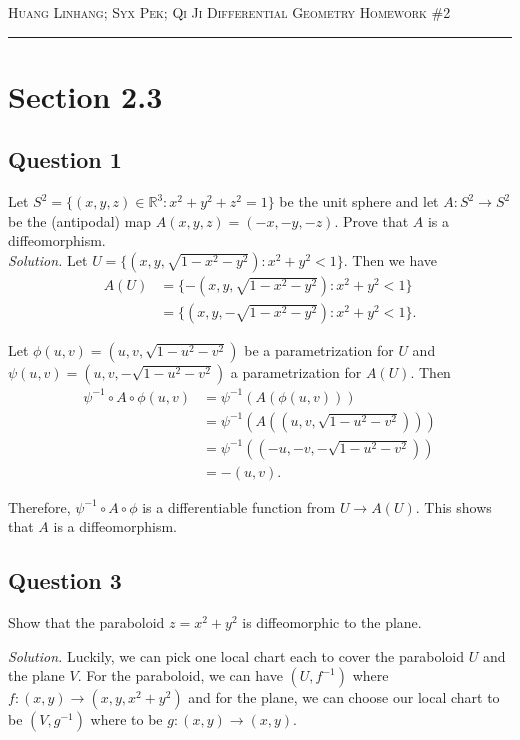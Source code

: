 \documentclass[12pt]{article}
\begin{document}
\thispagestyle{empty}

{\scshape Huang Linhang; Syx Pek; Qi Ji} \hfill {\scshape \large Differential Geometry} \hfill {\scshape Homework \#2}

\smallskip
\hrule
\bigskip

\section{Section 2.3}

\subsection*{Question 1}
Let $S^2 = \{(x,y,z) \in \mathbb{R}^3:x^2+y^2+z^2= 1\}$ be the unit sphere and let $A:S^2 \to S^2$ be the (antipodal) map $A(x,y, z) = (-x, -y, -z)$. Prove that $A$ is a diffeomorphism.\\

\textit{Solution.}
Let $U = \{(x,y,\sqrt{1-x^2-y^2}):x^2+y^2<1\}$. Then we have \begin{align*}
    A(U) &=\{-(x,y,\sqrt{1-x^2-y^2}):x^2+y^2<1\}\\
    &=\{(x,y,-\sqrt{1-x^2-y^2}):x^2+y^2<1\}.
\end{align*}

Let $\phi(u,v) = (u,v,\sqrt{1-u^2-v^2})$ be a parametrization for $U$ and $\psi(u,v) = (u,v,-\sqrt{1-u^2-v^2})$ a parametrization for $A(U)$. Then \begin{align*}
    \psi^{-1}\circ A\circ\phi(u,v) &= \psi^{-1}(A(\phi(u,v)))\\
    &= \psi^{-1}(A((u,v,\sqrt{1-u^2-v^2})))\\
    &= \psi^{-1}((-u,-v,-\sqrt{1-u^2-v^2}))\\
    &= -(u,v).
\end{align*}

Therefore, $\psi^{-1}\circ A\circ\phi$ is a differentiable function from $U\to A(U)$. This shows that $A$ is a diffeomorphism.

\subsection*{Question 3}

Show that the paraboloid $z = x^2 + y^2$
is diffeomorphic to the plane.

\textit{Solution.}  Luckily, we can pick one local chart each
to cover the paraboloid $U$ and the plane $V$. For the paraboloid, we can have $(U, f^{-1})$ where
$f: (x, y) \to (x, y, x^2 + y^2)$ and for the plane, we can choose our local chart to be $(V, g^{-1})$ where
to be $g: (x, y) \to (x, y).$
\end{document}
